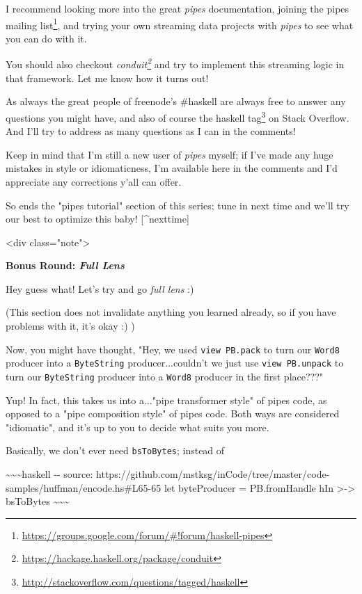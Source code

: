 \documentclass[]{article}
\renewcommand{\href}[2]{#2\footnote{\url{#1}}}
\begin{document}
I recommend looking more into the great \emph{pipes} documentation, joining the
\href{https://groups.google.com/forum/\#!forum/haskell-pipes}{pipes mailing
list}, and trying your own streaming data projects with \emph{pipes} to see what
you can do with it.

You should also checkout
\emph{\href{https://hackage.haskell.org/package/conduit}{conduit}} and try to
implement this streaming logic in that framework. Let me know how it turns out!

As always the great people of freenode's \#haskell are always free to answer any
questions you might have, and also of course the
\href{http://stackoverflow.com/questions/tagged/haskell}{haskell tag} on Stack
Overflow. And I'll try to address as many questions as I can in the comments!

Keep in mind that I'm still a new user of \emph{pipes} myself; if I've made any
huge mistakes in style or idiomaticness, I'm available here in the comments and
I'd appreciate any corrections y'all can offer.

So ends the "pipes tutorial" section of this series; tune in next time and we'll
try our best to optimize this baby! {[}\^{}nexttime{]}

\textless{}div class="note"\textgreater{}

\textbf{Bonus Round: \emph{Full Lens}}

Hey guess what! Let's try and go \emph{full lens} :)

(This section does not invalidate anything you learned already, so if you have
problems with it, it's okay :) )

Now, you might have thought, "Hey, we used \texttt{view\ PB.pack} to turn our
\texttt{Word8} producer into a \texttt{ByteString} producer...couldn't we just
use \texttt{view\ PB.unpack} to turn our \texttt{ByteString} producer into a
\texttt{Word8} producer in the first place???"

Yup! In fact, this takes us into a..."pipe transformer style" of pipes code, as
opposed to a "pipe composition style" of pipes code. Both ways are considered
"idiomatic", and it's up to you to decide what suits you more.

Basically, we don't ever need \texttt{bsToBytes}; instead of

\textasciitilde{}\textasciitilde{}\textasciitilde{}haskell -\/- source:
https://github.com/mstksg/inCode/tree/master/code-samples/huffman/encode.hs\#L65-65
let byteProducer = PB.fromHandle hIn \textgreater{}-\textgreater{} bsToBytes
\textasciitilde{}\textasciitilde{}\textasciitilde{}
\end{document}
